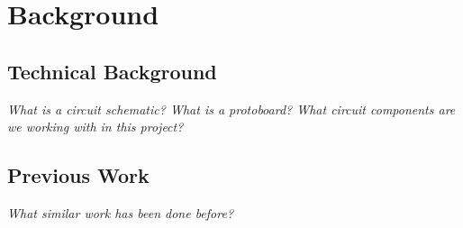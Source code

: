 
\chapter{Background}

\section{Technical Background}

\textit{What is a circuit schematic? What is a protoboard? What circuit
components are we working with in this project?}

\section{Previous Work}

\textit{What similar work has been done before?}
